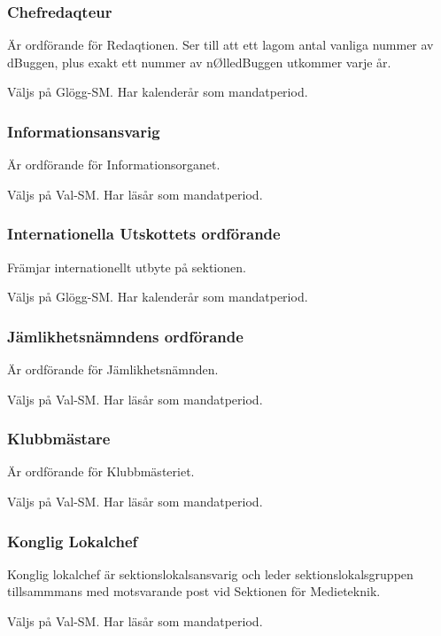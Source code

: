 \documentclass{dgovdoc}
\begin{document}
\subsubsection{Chefredaqteur}

Är ordförande för Redaqtionen. Ser till att ett lagom antal vanliga nummer av
dBuggen, plus exakt ett nummer av nØlledBuggen utkommer varje år.

Väljs på Glögg-SM. Har kalenderår som mandatperiod.

\subsubsection{Informationsansvarig}

Är ordförande för Informationsorganet.

Väljs på Val-SM. Har läsår som mandatperiod.

\subsubsection{Internationella Utskottets ordförande}

Främjar internationellt utbyte på sektionen.

Väljs på Glögg-SM. Har kalenderår som mandatperiod.

\subsubsection{Jämlikhetsnämndens ordförande}

Är ordförande för Jämlikhetsnämnden.

Väljs på Val-SM. Har läsår som mandatperiod.

\subsubsection{Klubbmästare}

Är ordförande för Klubbmästeriet.

Väljs på Val-SM. Har läsår som mandatperiod.

\subsubsection{Konglig Lokalchef}

Konglig lokalchef är sektionslokalsansvarig och leder sektionslokalsgruppen
tillsammmans med motsvarande post vid Sektionen för Medieteknik.

Väljs på Val-SM. Har läsår som mandatperiod.
\end{document}
